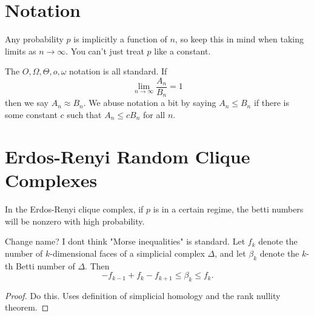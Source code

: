 \documentclass[twoside,10pt]{report}
\begin{document}


\section{Notation}

Any probability $p$ is implicitly a function of $n$, so keep this in mind when taking limits as $n\to \infty$. You can't just treat $p$ like a constant.

The $O,\Omega,\Theta,o,\omega$ notation is all standard. If
\[
\lim_{n \to \infty} \frac{A_{n}}{B_{n}} =1
\] then we say $A_{n} \approx B_{n}$. We abuse notation a bit by saying $A_{n} \leq B_{n}$ if there is some constant $c$ such that $A_{n} \leq c B_{n}$ for all $n$.


\section{Erdos-Renyi Random Clique Complexes}

\begin{imp}
In the Erdos-Renyi clique complex, if $p$ is in a certain regime, the betti numbers will be nonzero with high probability.
\end{imp}

\begin{lem}
	{\color{red}Change name? I dont think "Morse inequalities" is standard.}
	Let $f_{k}$ denote the number of $k$-dimensional faces of a simplicial complex $\Delta$, and let $\beta_{k}$ denote the $k$-th Betti number of $\Delta$. Then
	\[
	-f_{k-1}+f_{k}-f_{k+1} \leq \beta_{k} \leq f_{k}.
	\] 
\end{lem}
\begin{proof}
	{\color{red}Do this. Uses definition of simplicial homology and the rank nullity theorem.}
\end{proof}
\end{document}
